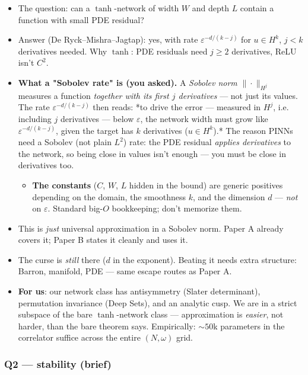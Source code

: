\documentclass[11pt]{article}
\begin{document}
\begin{itemize}
\item The question: can a $\tanh$-network of width $W$ and depth $L$ contain a
function with small PDE residual?
\item Answer (De Ryck--Mishra--Jagtap): yes, with rate $\varepsilon^{-d/(k-j)}$
for $u \in H^k$, $j < k$ derivatives needed. Why $\tanh$: PDE residuals
need $j \ge 2$ derivatives, ReLU isn't $C^2$.
\item \textbf{What a "Sobolev rate" is (you asked).} A \emph{Sobolev norm} $\|\cdot\|_{H^j}$
measures a function \emph{together with its first $j$ derivatives} --- not just
its values. The rate $\varepsilon^{-d/(k-j)}$ then reads: *to drive the
error --- measured in $H^j$, i.e. including $j$ derivatives --- below
$\varepsilon$, the network width must grow like $\varepsilon^{-d/(k-j)}$,
given the target has $k$ derivatives ($u\in H^k$).* The reason PINNs need
a Sobolev (not plain $L^2$) rate: the PDE residual \emph{applies derivatives}
to the network, so being close in values isn't enough --- you must be close
in derivatives too.
\begin{itemize}
\item \textbf{The constants} ($C$, $W$, $L$ hidden in the bound) are generic
positives depending on the domain, the smoothness $k$, and the
dimension $d$ --- \emph{not} on $\varepsilon$. Standard big-$O$ bookkeeping;
don't memorize them.
\end{itemize}
\item This is \emph{just} universal approximation in a Sobolev norm. Paper A
already covers it; Paper B states it cleanly and uses it.
\item The curse is \emph{still} there ($d$ in the exponent). Beating it needs extra
structure: Barron, manifold, PDE --- same escape routes as Paper A.
\item \textbf{For us}: our network class has antisymmetry (Slater determinant),
permutation invariance (Deep Sets), and an analytic cusp. We are in a
strict subspace of the bare $\tanh$-network class --- approximation is
\emph{easier}, not harder, than the bare theorem says. Empirically: $\sim
  50$k parameters in the correlator suffice across the entire $(N, \omega)$
grid.
\end{itemize}
\subsubsection*{Q2 --- stability (brief)}
\end{document}

